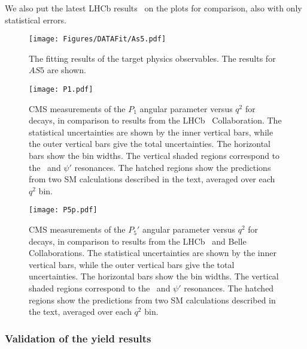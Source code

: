 We also put the latest LHCb results~\cite{LHCbP5p} on the plots for comparison, also with only statistical errors.


\begin{figure}[!hbtp]
  \centering
  \texttt{[image: Figures/DATAFit/As5.pdf]}
  \caption{The fitting results of the target physics observables.
    The results for $AS5$ are shown.}
  \label{fig:fitresultAs5}
\end{figure}


\begin{figure}[htbp!]
  \begin{center}
    \texttt{[image: P1.pdf]}
    \caption{CMS measurements of the $P_1$ angular parameter versus $q^2$ for \BtoKstmumu decays, in comparison to results from the LHCb~\cite{LHCbP5p2} Collaboration.
      The statistical uncertainties are shown by the inner vertical bars, while the outer vertical bars give the total uncertainties.
      The horizontal bars show the bin widths. The vertical shaded regions correspond to the \cPJgy\ and $\psi'$ resonances.
      The hatched regions show the predictions from two SM calculations described in the text, averaged over each $q^2$ bin.}
    \label{fig:fitresultP1}
  \end{center}
\end{figure}

\begin{figure}[htbp!]
  \begin{center}
    \texttt{[image: P5p.pdf]}
    \caption{CMS measurements of the $P_5'$ angular parameter versus $q^2$ for \BtoKstmumu decays, in comparison to results from the LHCb~\cite{LHCbP5p2} and Belle~\cite{BelleP5p} Collaborations.
      The statistical uncertainties are shown by the inner vertical bars, while the outer vertical bars give the total uncertainties.
      The horizontal bars show the bin widths. The vertical shaded regions correspond to the \cPJgy\ and $\psi'$ resonances.
      The hatched regions show the predictions from two SM calculations described in the text, averaged over each $q^2$ bin.}
    \label{fig:fitresultp5}
  \end{center}
\end{figure}

\subsubsection{Validation of the yield results}\label{sec:yieldComp}

